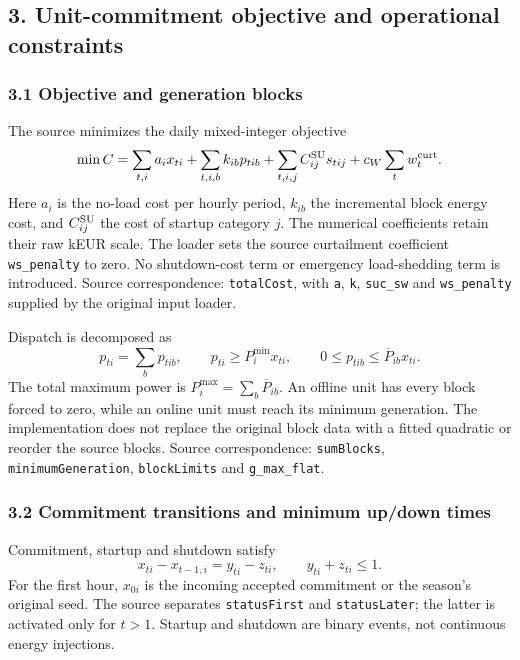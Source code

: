 \documentclass[
  11pt,
  a4paper,
]{article}
\begin{document}
\subsection{3. Unit-commitment objective and operational
constraints}\label{unit-commitment-objective-and-operational-constraints}

\subsubsection{3.1 Objective and generation
blocks}\label{objective-and-generation-blocks}

The source minimizes the daily mixed-integer objective \[
\min C=\sum_{t,i}a_i x_{ti}+\sum_{t,i,b}k_{ib}p_{tib}+\sum_{t,i,j}C^{\rm SU}_{ij}s_{tij}+c_W\sum_t w_t^{\rm curt}.
\] Here \(a_i\) is the no-load cost per hourly period, \(k_{ib}\) the
incremental block energy cost, and \(C^{\rm SU}_{ij}\) the cost of
startup category \(j\). The numerical coefficients retain their raw kEUR
scale. The loader sets the source curtailment coefficient
\texttt{ws\_penalty} to zero. No shutdown-cost term or emergency
load-shedding term is introduced. Source correspondence:
\texttt{totalCost}, with \texttt{a}, \texttt{k}, \texttt{suc\_sw} and
\texttt{ws\_penalty} supplied by the original input loader.

Dispatch is decomposed as \[
p_{ti}=\sum_b p_{tib},\qquad p_{ti}\ge P_i^{\min}x_{ti},\qquad 0\le p_{tib}\le \overline P_{ib}x_{ti}.
\] The total maximum power is \(P_i^{\max}=\sum_b\overline P_{ib}\). An
offline unit has every block forced to zero, while an online unit must
reach its minimum generation. The implementation does not replace the
original block data with a fitted quadratic or reorder the source
blocks. Source correspondence: \texttt{sumBlocks},
\texttt{minimumGeneration}, \texttt{blockLimits} and
\texttt{g\_max\_flat}.

\subsubsection{3.2 Commitment transitions and minimum up/down
times}\label{commitment-transitions-and-minimum-updown-times}

Commitment, startup and shutdown satisfy \[
x_{ti}-x_{t-1,i}=y_{ti}-z_{ti},\qquad y_{ti}+z_{ti}\le1.
\] For the first hour, \(x_{0i}\) is the incoming accepted commitment or
the season's original seed. The source separates \texttt{statusFirst}
and \texttt{statusLater}; the latter is activated only for \(t>1\).
Startup and shutdown are binary events, not continuous energy
injections.
\end{document}
